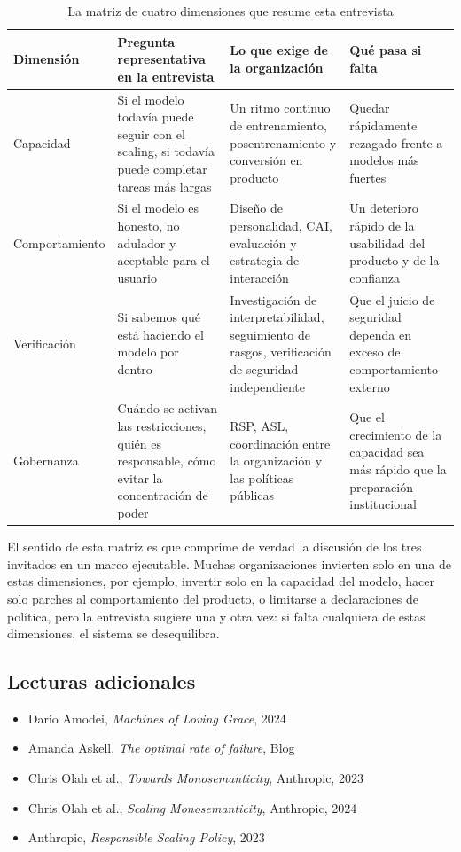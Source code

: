\documentclass[a4paper]{article}
\begin{document}
\begin{table}[H]
\centering
\begin{tabular}{p{} p{} p{} p{}}
\toprule
Dimensión & Pregunta representativa en la entrevista & Lo que exige de la organización & Qué pasa si falta \\
\midrule
Capacidad & Si el modelo todavía puede seguir con el scaling, si todavía puede completar tareas más largas & Un ritmo continuo de entrenamiento, posentrenamiento y conversión en producto & Quedar rápidamente rezagado frente a modelos más fuertes \\
Comportamiento & Si el modelo es honesto, no adulador y aceptable para el usuario & Diseño de personalidad, CAI, evaluación y estrategia de interacción & Un deterioro rápido de la usabilidad del producto y de la confianza \\
Verificación & Si sabemos qué está haciendo el modelo por dentro & Investigación de interpretabilidad, seguimiento de rasgos, verificación de seguridad independiente & Que el juicio de seguridad dependa en exceso del comportamiento externo \\
Gobernanza & Cuándo se activan las restricciones, quién es responsable, cómo evitar la concentración de poder & RSP, ASL, coordinación entre la organización y las políticas públicas & Que el crecimiento de la capacidad sea más rápido que la preparación institucional \\
\bottomrule
\end{tabular}
\caption{La matriz de cuatro dimensiones que resume esta entrevista}
\end{table}

El sentido de esta matriz es que comprime de verdad la discusión de los tres invitados en un marco ejecutable. Muchas organizaciones invierten solo en una de estas dimensiones, por ejemplo, invertir solo en la capacidad del modelo, hacer solo parches al comportamiento del producto, o limitarse a declaraciones de política, pero la entrevista sugiere una y otra vez: si falta cualquiera de estas dimensiones, el sistema se desequilibra.

\subsection{Lecturas adicionales}

\begin{itemize}
    \item Dario Amodei, \textit{Machines of Loving Grace}, 2024
    \item Amanda Askell, \textit{The optimal rate of failure}, Blog
    \item Chris Olah et al., \textit{Towards Monosemanticity}, Anthropic, 2023
    \item Chris Olah et al., \textit{Scaling Monosemanticity}, Anthropic, 2024
    \item Anthropic, \textit{Responsible Scaling Policy}, 2023
\end{itemize}
\end{document}
